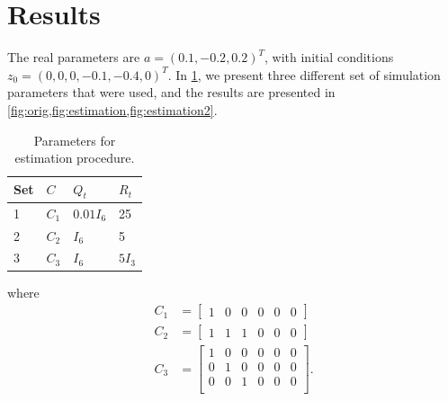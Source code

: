 \section{Results}\label{sec:pre}
The real parameters are $a=(0.1, -0.2, 0.2)^T$, with initial conditions $z_0=(0,0,0,-0.1, -0.4,  0)^T$. In \cref{tab:params}, we present three different set of simulation parameters that were used, and the results are presented in \cref{fig:orig,fig:estimation,fig:estimation2}.


\begin{table}[H]
\centering
\begin{tabular}{llll}
\hline
\textbf{Set} & \textbf{\boldmath$C$} & \textbf{\boldmath$Q_t$} & \textbf{\boldmath$R_t$} \\ \hline
1            & $C_1$                 & $0.01 I_6$        & 25                      \\
2            & $C_2$                 & $I_6$                   & 5                       \\
3            & $C_3$                 & $I_6$                   & $5 I_3$           \\ \hline
\end{tabular}
\caption{Parameters for estimation procedure.}
\label{tab:params}
\end{table}
where
\[
\begin{split}
C_1&=\begin{bmatrix}
  1 & 0 & 0 & 0 & 0 & 0
\end{bmatrix}\\
C_2&=\begin{bmatrix}
  1 & 1 & 1 & 0 & 0 & 0
\end{bmatrix}\\
C_3&=\begin{bmatrix}
  1 & 0 & 0 & 0 & 0 & 0\\
  0 & 1 & 0 & 0 & 0 & 0\\
  0 & 0 & 1 & 0 & 0 & 0\\
\end{bmatrix}.
\end{split}
\]

